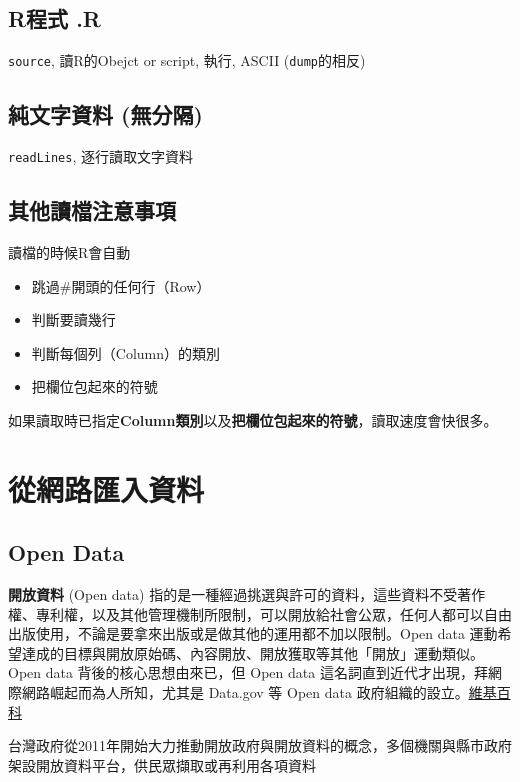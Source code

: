 \documentclass[]{book}
\providecommand{\tightlist}{%
  \setlength{\itemsep}{0pt}\setlength{\parskip}{0pt}}
\theoremstyle{definition}
\theoremstyle{definition}
\theoremstyle{remark}
\begin{document}
\subsection{R程式 .R}\label{r-.r}

\texttt{source}, 讀R的Obejct or script, 執行, ASCII
(\texttt{dump}的相反)

\subsection{純文字資料 (無分隔)}\label{-}

\texttt{readLines}, 逐行讀取文字資料

\subsection{其他讀檔注意事項}

讀檔的時候R會自動

\begin{itemize}
\tightlist
\item
  跳過\#開頭的任何行（Row）
\item
  判斷要讀幾行
\item
  判斷每個列（Column）的類別
\item
  把欄位包起來的符號
\end{itemize}

如果讀取時已指定\textbf{Column類別}以及\textbf{把欄位包起來的符號}，讀取速度會快很多。

\section{從網路匯入資料}

\subsection{Open Data}\label{open-data}

\textbf{開放資料} (Open data)
指的是一種經過挑選與許可的資料，這些資料不受著作權、專利權，以及其他管理機制所限制，可以開放給社會公眾，任何人都可以自由出版使用，不論是要拿來出版或是做其他的運用都不加以限制。Open
data
運動希望達成的目標與開放原始碼、內容開放、開放獲取等其他「開放」運動類似。Open
data 背後的核心思想由來已，但 Open data
這名詞直到近代才出現，拜網際網路崛起而為人所知，尤其是 Data.gov 等 Open
data
政府組織的設立。\href{https://zh.wikipedia.org/wiki/\%E9\%96\%8B\%E6\%94\%BE\%E8\%B3\%87\%E6\%96\%99}{維基百科}

台灣政府從2011年開始大力推動開放政府與開放資料的概念，多個機關與縣市政府架設開放資料平台，供民眾擷取或再利用各項資料
\end{document}
